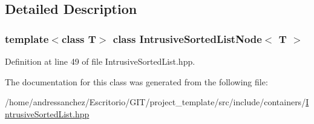 \subsection{Detailed Description}
\subsubsection*{template$<$class T$>$\newline
class Intrusive\+Sorted\+List\+Node$<$ T $>$}



Definition at line 49 of file Intrusive\+Sorted\+List.\+hpp.



The documentation for this class was generated from the following file\+:\begin{DoxyCompactItemize}
\item 
/home/andressanchez/\+Escritorio/\+G\+I\+T/project\+\_\+template/src/include/containers/\hyperlink{IntrusiveSortedList_8hpp}{Intrusive\+Sorted\+List.\+hpp}\end{DoxyCompactItemize}

